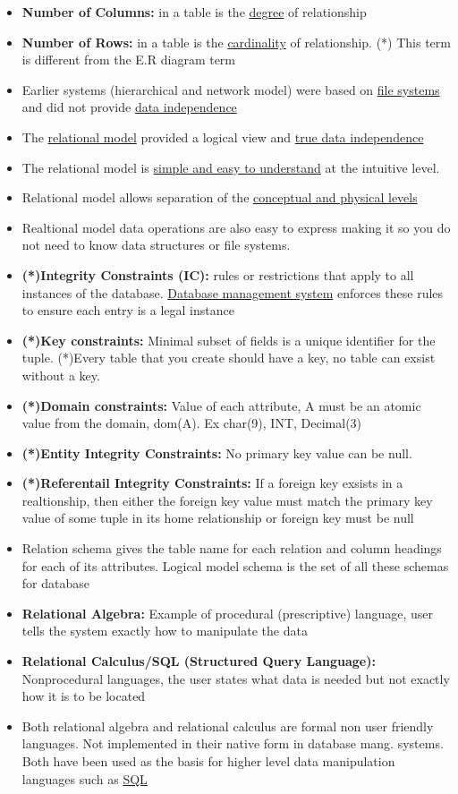 \documentclass[12pt]{article}
\begin{document}
\begin{itemize}
		\item \textbf{Number of Columns:} in a table is the \underline{degree} of relationship
		\item \textbf{Number of Rows:} in a table is the \underline{cardinality} of relationship. (*) This 
			term is different from the E.R diagram term
		\item Earlier systems (hierarchical and network model) were based on 
			\underline{file systems} and did not provide \underline{data independence}
		\item The \underline{relational model} provided a logical view and \underline{true data independence}
		\item The relational model is \underline{simple and easy to understand} at the intuitive level.
		\item Relational model allows separation of the \underline{conceptual and physical levels}
		\item Realtional model data operations are also easy to express making it so you do not need to know
			data structures or file systems.
		\item \textbf{(*)Integrity Constraints (IC):} rules or restrictions that apply to all instances
			of the database. \underline{Database management system} enforces these rules to ensure each 
			entry is a legal instance
		\item \textbf{(*)Key constraints:} Minimal subset of fields is a unique identifier for the tuple.
			(*)Every table that you create should have a key, no table can exsist without a key.
		\item \textbf{(*)Domain constraints:} Value of each attribute, A must be an atomic value from 
			the domain, dom(A). Ex char(9), INT, Decimal(3)
		\item \textbf{(*)Entity Integrity Constraints:} No primary key value can be null.
		\item \textbf{(*)Referentail Integrity Constraints:} If a foreign key exsists in a realtionship, then either 
			the foreign key value must match the primary key value of some tuple in its home relationship or 
			foreign key must be null
		\item Relation schema gives the table name for each relation and column headings for each of its 
			attributes. Logical model schema is the set of all these schemas for database
		\item \textbf{Relational Algebra:} Example of procedural (prescriptive) language, user tells the 
			system exactly how to manipulate the data
		\item \textbf{Relational Calculus/SQL (Structured Query Language):} Nonprocedural languages,
			the user states what data is needed but not exactly how it is to be located
		\item Both relational algebra and relational calculus are formal non user friendly languages. Not 
			implemented in their native form in database mang. systems. Both have been used as the basis
			for higher level data manipulation languages such as \underline{SQL}
\end{itemize}
\end{document}

